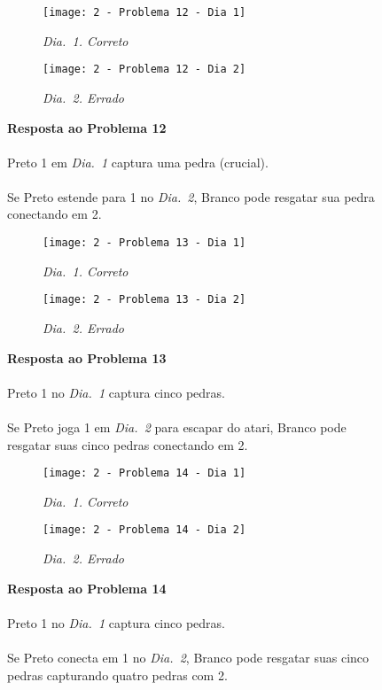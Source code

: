 \vfill

\begin{SCfigure}[][h!]
    \begin{subfigure}[t]{.31\textwidth}
        \texttt{[image: 2 - Problema 12 - Dia 1]}
        \caption*{\emph{Dia.\@~1. Correto}}
    \end{subfigure}
    \hfill
    \begin{subfigure}[t]{.31\textwidth}
        \texttt{[image: 2 - Problema 12 - Dia 2]}
        \caption*{\emph{Dia.\@~2. Errado}}
    \end{subfigure}
    \hfill
    \caption*{\textbf{Resposta ao Problema 12}\\\\Preto 1 em \emph{Dia.\@~1} captura uma pedra (crucial).\\\\Se Preto estende para 1 no \emph{Dia.\@~2}, Branco pode resgatar sua pedra conectando em 2.}
\end{SCfigure}

\pagebreak

\begin{SCfigure}[][h!]
    \begin{subfigure}[t]{.31\textwidth}
        \texttt{[image: 2 - Problema 13 - Dia 1]}
        \caption*{\emph{Dia.\@~1. Correto}}
    \end{subfigure}
    \hfill
    \begin{subfigure}[t]{.31\textwidth}
        \texttt{[image: 2 - Problema 13 - Dia 2]}
        \caption*{\emph{Dia.\@~2. Errado}}
    \end{subfigure}
    \hfill
    \caption*{\textbf{Resposta ao Problema 13}\\\\Preto 1 no \emph{Dia.\@~1} captura cinco pedras.\\\\Se Preto joga 1 em \emph{Dia.\@~2} para escapar do atari, Branco pode resgatar suas cinco pedras conectando em 2.}
\end{SCfigure}

\vfill

\begin{SCfigure}[][h!]
    \begin{subfigure}[t]{.31\textwidth}
        \texttt{[image: 2 - Problema 14 - Dia 1]}
        \caption*{\emph{Dia.\@~1. Correto}}
    \end{subfigure}
    \hfill
    \begin{subfigure}[t]{.31\textwidth}
        \texttt{[image: 2 - Problema 14 - Dia 2]}
        \caption*{\emph{Dia.\@~2. Errado}}
    \end{subfigure}
    \hfill
    \caption*{\textbf{Resposta ao Problema 14}\\\\Preto 1 no \emph{Dia.\@~1} captura cinco pedras.\\\\Se Preto conecta em 1 no \emph{Dia.\@~2}, Branco pode resgatar suas cinco pedras capturando quatro pedras com 2.}
\end{SCfigure}

